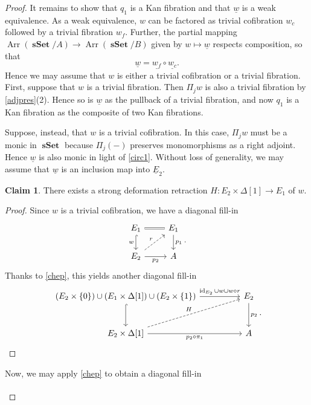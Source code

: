 \documentclass[10pt,letterpaper,cm]{nupset}
\theoremstyle{definition}
\theoremstyle{theorem}
\newtheorem*{claim}{Claim}
\theoremstyle{remark}
\newcommand{\0}{\mathbf{0}}
\newcommand{\1}{\mathbf{1}}
\newcommand{\2}{\mathbf{2}}
\DeclareMathOperator{\sset}{\mathbf{sSet}}
\DeclareMathOperator{\Ar}{Arr}
\DeclareMathOperator{\idd}{id}
\begin{document}
\begin{proof}
It remains to show that $q_1$ is a Kan fibration and that $\underline{w}$ is a weak equivalence. As a weak equivalence, $w$ can be factored as trivial cofibration $w_c$ followed by a trivial fibration $w_f$. Further, the partial mapping $\Ar(\sset/A)\to \Ar(\sset/B)$ given by $w\mapsto \underline{w}$  respects composition, so that $$\underline{w} = \underline{w_f}\circ \underline{w_c}.$$ Hence we may assume that $w$ is either a trivial cofibration or a trivial fibration. First, suppose that $w$ is a trivial fibration. Then $\Pi_j{w}$ is also a trivial fibration by \cref{adjpres}(2). Hence so is $\underline{w}$ as the pullback of a trivial fibration, and now $q_1$ is a Kan fibration as the composite of two Kan fibrations.

\medskip

Suppose, instead, that $w$ is a trivial cofibration. In this case, $\Pi_j{w}$ must be a monic in $\sset$ because $\Pi_j({-})$ preserves monomorphisms as a right adjoint. Hence $\underline{w}$ is also monic in light of \eqref{circ1}. Without loss of generality, we may assume that $\underline{w}$ is an inclusion map into $\underline{E}_2$. 
\begin{claim}
There exists a strong deformation retraction $H: E_2 \times \Delta[1] \to E_1$ of  $w$.
\end{claim}
\begin{proof}
Since $w$ is a trivial cofibration, we have a diagonal fill-in
\[
\begin{tikzcd}
E_1 \arrow[d, "w"', hook] \arrow[r, equal]           & E_1 \arrow[d, "p_1"] \\
E_2 \arrow[r, "p_2"'] \arrow[ru, "r", dashed] & A                   
\end{tikzcd}.
\] Thanks to \cref{chep}, this yields another diagonal fill-in
\[
\begin{tikzcd}[column sep=huge, row sep=large]
\left(E_2\times \left\{0\right\}\right)\cup \left(E_1\times \Delta[1]\right)\cup \left(E_2\times \left\{1\right\}\right) \arrow[d, hook] \arrow[r, "\idd_{E_2}\cup w\cup w\circ r"] & E_2 \arrow[d, "p_2"] \\
{E_2\times \Delta[1]} \arrow[r, "p_2\circ \pi_1"'] \arrow[ru, "H", dashed]                                                                                                  & A                   
\end{tikzcd}
.\]
\end{proof}
Now, we may apply \cref{chep} to obtain a diagonal fill-in
\[
\begin{tikzcd}[column sep=huge, row sep=large]

\end{tikzcd}\]
\end{proof}
\end{document}
